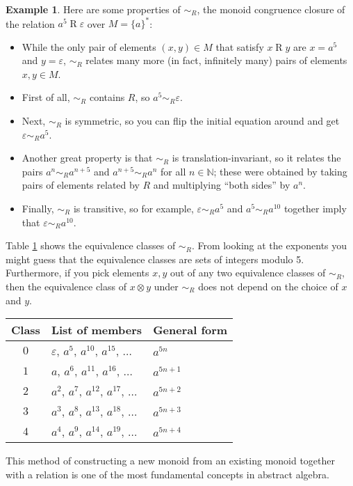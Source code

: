 \documentclass[a4paper,headsepline,bibliography=totoc,toc=flat,fleqn,twoside=semi]{scrbook}
\theoremstyle{definition}
\theoremstyle{definition}
\newtheorem{example}{Example}[chapter]
\theoremstyle{definition}
\begin{document}
\begin{example}
Here are some properties of $\sim_R$, the monoid congruence closure of the relation $a^5\mathrel{R}\varepsilon$ over $M=\{a\}^*$:

\begin{itemize}
\item While the only pair of elements $(x, y)\in M$ that satisfy $x\mathrel{R}y$ are $x=a^5$ and $y=\varepsilon$, $\sim_R$ relates many more (in fact, infinitely many) pairs of elements $x, y\in M$.
\item First of all, $\sim_R$ contains $R$, so $a^5\sim_R\varepsilon$.
\item Next, $\sim_R$ is symmetric, so you can flip the initial equation around and get $\varepsilon\sim_R a^5$.
\item Another great property is that $\sim_R$ is translation-invariant, so it relates the pairs $a^n\sim_R a^{n+5}$ and $a^{n+5}\sim_R a^n$ for all $n\in\mathbb{N}$; these were obtained by taking pairs of elements related by $R$ and multiplying ``both sides'' by $a^n$.
\item Finally, $\sim_R$ is transitive, so for example, $\varepsilon\sim_R a^5$ and $a^5\sim_R a^{10}$ together imply that $\varepsilon\sim_R a^{10}$.
\end{itemize}

Table \ref{classesmod5} shows the equivalence classes of $\sim_R$. From looking at the exponents you might guess that the equivalence classes are sets of integers modulo 5. Furthermore, if you pick elements $x, y$ out of any two equivalence classes of $\sim_R$, then the equivalence class of $x\otimes y$ under $\sim_R$ does not depend on the choice of $x$ and $y$.

\begin{table}\label{classesmod5}
\begin{center}
{\renewcommand{\arraystretch}{1.5}
\begin{tabular}{c|l|l}
Class&List of members&General form\\
\hline
\hline
$0$&$\varepsilon$, $a^5$, $a^{10}$, $a^{15}$, $\ldots$&$a^{5n}$\\
$1$&$a$, $a^6$, $a^{11}$, $a^{16}$, $\ldots$&$a^{5n+1}$\\
$2$&$a^2$, $a^7$, $a^{12}$, $a^{17}$, $\ldots$&$a^{5n+2}$\\
$3$&$a^3$, $a^8$, $a^{13}$, $a^{18}$, $\ldots$&$a^{5n+3}$\\
$4$&$a^4$, $a^9$, $a^{14}$, $a^{19}$, $\ldots$&$a^{5n+4}$\\
\end{tabular}
}
\end{center}
\end{table}
\end{example}
This method of constructing a new monoid from an existing monoid together with a relation is one of the most fundamental concepts in abstract algebra.
\end{document}
